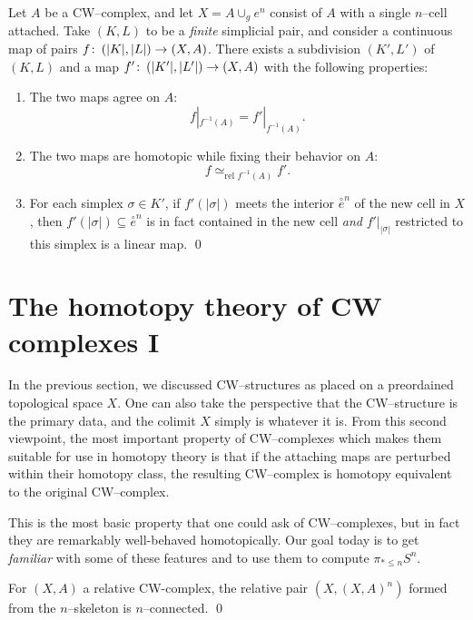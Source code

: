 \begin{lemma}%
Let $A$ be a CW--complex, and let $X = A \cup_g e^n$ consist of $A$ with a single $n$--cell attached.
Take $(K, L)$ to be a \emph{finite} simplicial pair, and consider a continuous map of pairs $f\colon\thinspace (|K|, |L|) \to (X, A)$.
There exists a subdivision $(K', L')$ of $(K, L)$ and a map $f'\colon\thinspace (|K'|, |L'|) \to (X, A)$ with the following properties:
\begin{enumerate}
    \item The two maps agree on $A$: \[f|_{f^{-1}(A)} = f'|_{f^{-1}(A)}.\]
    \item The two maps are homotopic while fixing their behavior on $A$: \[f \simeq_{\text{rel $f^{-1}(A)$}} f'.\]
    \item For each simplex $\sigma \in K'$, if $f'(|\sigma|)$ meets the interior $\overset \circ e^n$ of the new cell in $X$, then $f'(|\sigma|) \subseteq \overset \circ e^n$ is in fact contained in the new cell \emph{and} $f'|_{|\sigma|}$ restricted to this simplex is a linear map. \qed
\end{enumerate}
\end{lemma}





\section{The homotopy theory of CW complexes I}

In the previous section, we discussed CW--structures as placed on a preordained topological space $X$.
One can also take the perspective that the CW--structure is the primary data, and the colimit $X$ simply is whatever it is.
From this second viewpoint, the most important property of CW--complexes which makes them suitable for use in homotopy theory is that if the attaching maps are perturbed within their homotopy class, the resulting CW--complex is homotopy equivalent to the original CW--complex.



This is the most basic property that one could ask of CW--complexes, but in fact they are remarkably well-behaved homotopically.  Our goal today is to get \emph{familiar} with some of these features and to use them to compute $\pi_{* \le n} S^n$.

\begin{lemma}%
For $(X, A)$ a relative CW-complex, the relative pair $(X, (X, A)^n)$ formed from the $n$--skeleton is $n$--connected. \qed
\end{lemma}

